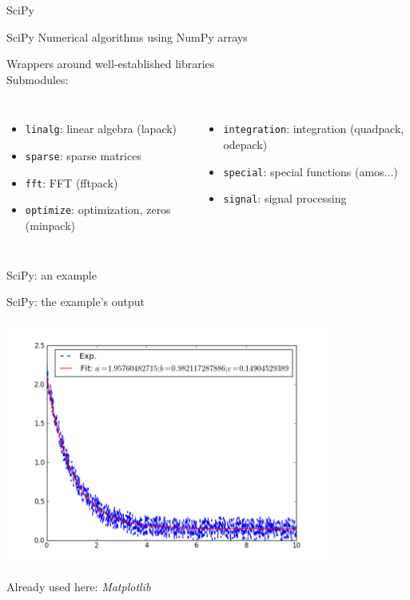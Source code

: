 \begin{frame}{SciPy}

\begin{exbox}{SciPy}
Numerical algorithms using NumPy arrays
\end{exbox}

Wrappers around well-established libraries\\[1.0ex]

Submodules:

\begin{columns}


\begin{itemize}
    \item {\texttt{linalg}}: linear algebra (lapack)
    \item{\texttt{sparse}}: sparse matrices
    \item {\texttt{fft}}: FFT (fftpack)
    \item {\texttt{optimize}}: optimization, zeros (minpack)
\end{itemize}



\begin{itemize}
    \item {\texttt{integration}}: integration (quadpack, odepack)
    \item {\texttt{special}}: special functions (amos...)
    \item {\texttt{signal}}: signal processing
\end{itemize}

\end{columns}

\end{frame}

\begin{frame}[fragile]{SciPy: an example}



\end{frame}

\begin{frame}{SciPy: the example's output}

\begin{center}
	\includegraphics[width=0.8\textwidth]{Figures/fit-png}
\end{center}

Already used here: \emph{Matplotlib}

\end{frame}


